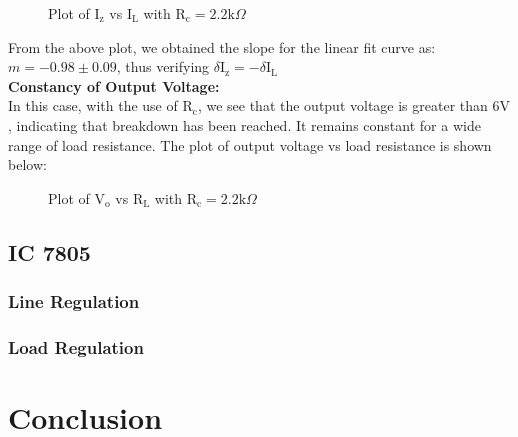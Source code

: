\documentclass{scrartcl}
\begin{document}
        \noindent
\begin{figure}[H]
        \centering
        
        \caption{Plot of $\mathrm{I_z}$ vs $\mathrm{I_L}$ with $\mathrm{R_c} = 2.2 \mathrm{k}\Omega$}
\end{figure}
\noindent
From the above plot, we obtained the slope for the linear fit curve as: ${m = -0.98\pm0.09}$, thus verifying  $\delta\mathrm{I_z} = - \delta\mathrm{I_L}$ \\[0.3cm]
\textbf{Constancy of Output Voltage:}\\[0.3cm]
In this case, with the use of $\mathrm{R_c}$, we see that the output voltage is greater than $6 \mathrm{V}$, indicating that breakdown has been reached. It remains constant for a wide range of load resistance. The plot of output voltage vs load resistance is shown below:
\begin{figure}[H]
        \centering
        
        \caption{Plot of $\mathrm{V_o}$ vs $\mathrm{R_L}$ with $\mathrm{R_c} = 2.2 \mathrm{k}\Omega$}
\end{figure}
\subsection{IC 7805}
\subsubsection{Line Regulation}
\subsubsection{Load Regulation}
\section{Conclusion}
\end{document}

